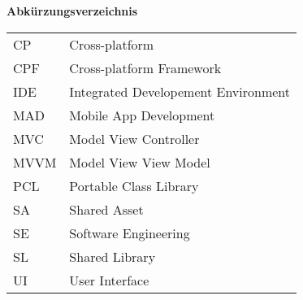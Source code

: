 %
%
% 
% 

\begin{center}
{\Large\bfseries Abkürzungsverzeichnis}
\end{center}

\begin{table*}[htbp]
		\begin{tabular}{ll}
			CP  &	Cross-platform \\
			CPF &	Cross-platform Framework \\
			IDE	&	Integrated Developement Environment\\
			MAD &	Mobile App Development \\
			MVC &	Model View Controller\\
			MVVM&	Model View View Model\\
			PCL	&	Portable Class Library\\
			SA 	&	Shared Asset\\
			SE	&	Software Engineering\\
			SL	&	Shared Library\\
			UI	&	User Interface\\
		\end{tabular}
\end{table*}